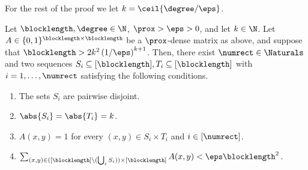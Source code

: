 \documentclass{toc}
\theoremstyle{plain}
\begin{document}
    For the rest of the proof we let $k = \ceil{\degree/\eps}$.

    \begin{claim}\label{claim:find all ones squares}
    Let $\blocklength,\degree \in \N$, $\prox > \eps >0$, and let $k \in \N$.
        Let $A \in \{0,1\}^{\blocklength \times \blocklength}$ be a $\prox$-dense matrix as above,
        and suppose that $\blocklength > 2k^2\left({1}/{\eps}\right)^{k+1}$.
        Then, there exist $\numrect \in \Naturals$ and two sequences $S_i \subseteq [\blocklength] ,T_i \subseteq [\blocklength]$ with $i=1, \dots, \numrect$
        satisfying the following conditions.
        \begin{enumerate}
%
%
            \item The sets $S_i$ are pairwise disjoint.                 %
            \item $\abs{S_i}=\abs{T_i} = k$.
            \item $A(x,y)=1$ for every $(x,y) \in S_i \times T_i$ and $i \in [\numrect]$.
%
            \item $\sum_{(x,y) \in  ([\blocklength] \setminus (\bigcup_i S_i)) \times [\blocklength]} A(x,y) < \eps \blocklength^2$. \label{item:leftover eps}      %
%
%
%
%
        \end{enumerate}
    \end{claim}
\end{document}
